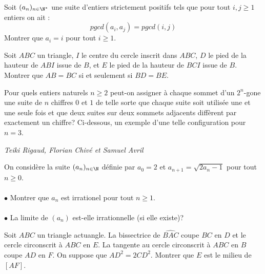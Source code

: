\begin{exo}{}
Soit $(a_n)_{n\in \N^*}$ une suite d'entiers strictement positifs tels que pour tout $i,j\ge 1$ entiers on ait :
$$pgcd(a_i,a_j)=pgcd(i,j)$$
Montrer que $a_i=i$ pour tout $i\ge 1$.
\end{exo}

\begin{exo}{}
Soit $ABC$ un triangle, $I$ le centre du cercle inscrit dans $ABC$, $D$ le pied de la hauteur de $ABI$ issue de $B$,
et $E$ le pied de la hauteur de $BCI$ issue de $B$.
Montrer que $AB = BC$ si et seulement si $BD = BE$.
\end{exo}

\begin{exo}{}
Pour quels entiers naturels $n\geq2$ peut-on assigner à chaque sommet d'un $2^n$-gone une suite de $n$ chiffres $0$ et $1$ de telle sorte que chaque suite soit utilisée une et une seule fois et que deux suites sur deux sommets adjacents diffèrent par exactement un chiffre? Ci-dessous, un exemple d'une telle configuration pour $n=3$.
\begin{center}
\end{center}

\medskip
\textit{Teiki Rigaud, Florian Chivé et Samuel Avril}
\end{exo}

\begin{exo}{}
On considère la suite $(a_n)_{n\in \N}$ définie par $a_0=2$ et $a_{n+1}=\sqrt{2a_n-1}$ pour tout $n\ge 0$.\\~~\\
$\bullet$ Montrer que $a_n$ est irrationel pour tout $n\ge 1$.\\~~\\
$\bullet$ La limite de $(a_n)$ est-elle irrationnelle (si elle existe)?
\end{exo}



\begin{exo}{}
Soit $ABC$ un triangle actuangle. La bissectrice de $\widehat{BAC}$ coupe $BC$ en $D$ et le cercle circonscrit à $ABC$ en $E$. La tangente au cercle circonscrit à $ABC$ en $B$ coupe $AD$ en $F$. On suppose que $AD^2=2CD^2$. Montrer que $E$ est le milieu de $[AF]$.
 \end{exo}
 
